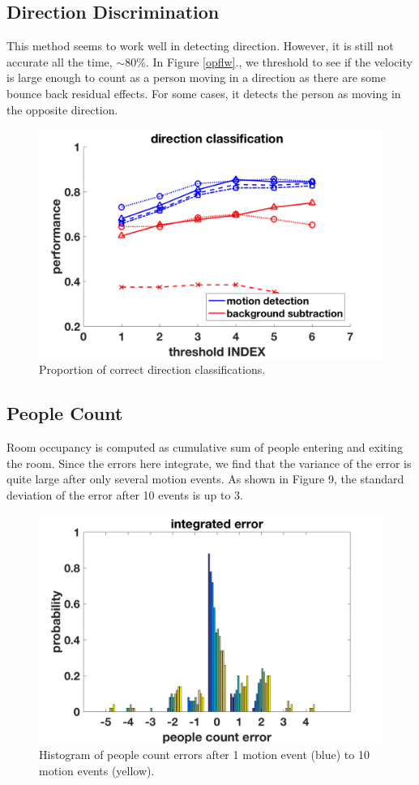 \documentclass[12pt,oneside]{article} %
\begin{document}
\subsection{Direction Discrimination}  %
This method seems to work well in detecting direction. However, it is still not accurate all the time, $\sim80\%$.
In Figure \ref{opflw}., we threshold to see if the velocity is large enough to count as a person moving in a direction
as there are some bounce back residual effects. For some 
cases, it detects the person as moving in the opposite direction. 
\begin{figure}[htb]
\centering
\includegraphics[scale=0.52]{images/dirClass.png}
\caption{Proportion of correct direction classifications.}
\label{dirclass}
\end{figure}

\subsection{People Count}
Room occupancy is computed as cumulative sum of people entering and exiting the room. Since the errors here
integrate, we find that the variance of the error is quite large after only several motion events. As shown in Figure 9,
the standard deviation of the error after 10 events is up to 3.
\begin{figure}[htb]
\centering
\includegraphics[scale=0.52]{images/pcerror_gamma020_hist.png}
\caption{Histogram of people count errors after 1 motion event (blue) to 10 motion events (yellow).}
\label{hist}
\end{figure}
\end{document}
